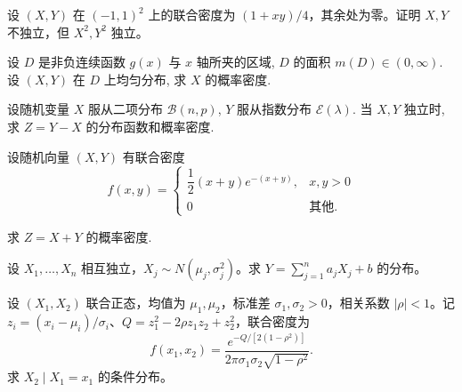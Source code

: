 \begin{exercise}[不独立变量的平方独立]\label{q:A4.17}
设 $(X,Y)$ 在 $(-1,1)^2$ 上的联合密度为 $(1+xy)/4$，其余处为零。证明 $X,Y$ 不独立，但 $X^2,Y^2$ 独立。\par{}\end{exercise}

\begin{exercise}[曲线下均匀点的投影]\label{q:A4.18}
设 $D$ 是非负连续函数 $g(x)$ 与 $x$ 轴所夹的区域, $D$ 的面积 $m(D)\in(0,\infty)$. 设 $(X,Y)$ 在 $D$ 上均匀分布, 求 $X$ 的概率密度.\par{}\end{exercise}

\begin{exercise}[离散与连续变量之差]\label{q:A4.19}
设随机变量 $X$ 服从二项分布 $\mathcal{B}(n,p)$, $Y$ 服从指数分布 $\mathcal{E}(\lambda)$. 当 $X,Y$ 独立时, 求 $Z=Y-X$ 的分布函数和概率密度.\par{}\end{exercise}

\begin{exercise}[求和变换后的边缘积分]\label{q:A4.23}
设随机向量 $(X,Y)$ 有联合密度
    \[f(x,y)=\begin{cases}
        \dfrac{1}{2}(x+y)e^{-(x+y)}, & x,y>0 \\
        0 & \text{其他}.
    \end{cases}\]

    求 $Z=X+Y$ 的概率密度.\par{}\end{exercise}

\begin{exercise}[独立正态的线性组合]\label{q:A4.27}
设 $X_1,\ldots,X_n$ 相互独立，$X_j\sim N(\mu_j,\sigma_j^2)$。求 $Y=\sum_{j=1}^n a_jX_j+b$ 的分布。\par{}\end{exercise}

\begin{exercise}[二维正态的条件分布]\label{q:A4.28}
设 $(X_1,X_2)$ 联合正态，均值为 $\mu_1,\mu_2$，标准差 $\sigma_1,\sigma_2>0$，相关系数 $|\rho|<1$。记 $z_i=(x_i-\mu_i)/\sigma_i$、$Q=z_1^2-2\rho z_1z_2+z_2^2$，联合密度为\[f(x_1,x_2)=\frac{e^{-Q/[2(1-\rho^2)]}}{2\pi\sigma_1\sigma_2\sqrt{1-\rho^2}}.\]求 $X_2\mid X_1=x_1$ 的条件分布。\par{}\end{exercise}

